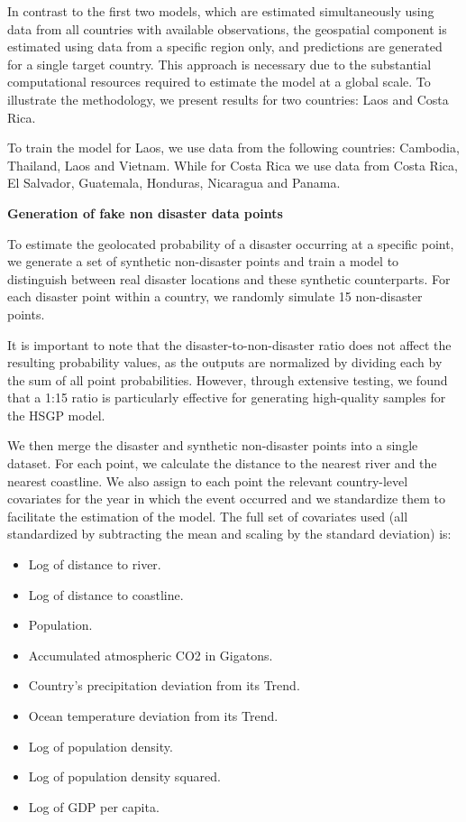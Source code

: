 In contrast to the first two models, which are estimated simultaneously using data from all countries with available observations, the geospatial component is estimated using data from a specific region only, and predictions are generated for a single target country. This approach is necessary due to the substantial computational resources required to estimate the model at a global scale. To illustrate the methodology, we present results for two countries: Laos and Costa Rica.

To train the model for Laos, we use data from the following countries: Cambodia, Thailand, Laos and Vietnam. While for Costa Rica we use data from Costa Rica, El Salvador, Guatemala, Honduras, Nicaragua and Panama.

\textbf{Generation of fake non disaster data points}

To estimate the geolocated probability of a disaster occurring at a specific point, we generate a set of synthetic non-disaster points and train a model to distinguish between real disaster locations and these synthetic counterparts. For each disaster point within a country, we randomly simulate 15 non-disaster points.

It is important to note that the disaster-to-non-disaster ratio does not affect the resulting probability values, as the outputs are normalized by dividing each by the sum of all point probabilities. However, through extensive testing, we found that a 1:15 ratio is particularly effective for generating high-quality samples for the HSGP model.

We then merge the disaster and synthetic non-disaster points into a single dataset. For each point, we calculate the distance to the nearest river and the nearest coastline. We also assign to each point the relevant country-level covariates for the year in which the event occurred and we standardize them to facilitate the estimation of the model. The full set of covariates used (all standardized by subtracting the mean and scaling by the standard deviation) is:

\begin{itemize}
    \item Log of distance to river.
    \item Log of distance to coastline.
    \item Population.
    \item Accumulated atmospheric CO2 in Gigatons.
    \item Country's precipitation deviation from its Trend.
    \item Ocean temperature deviation from its Trend.
    \item Log of population density.
    \item Log of population density squared.
    \item Log of GDP per capita.
\end{itemize}

